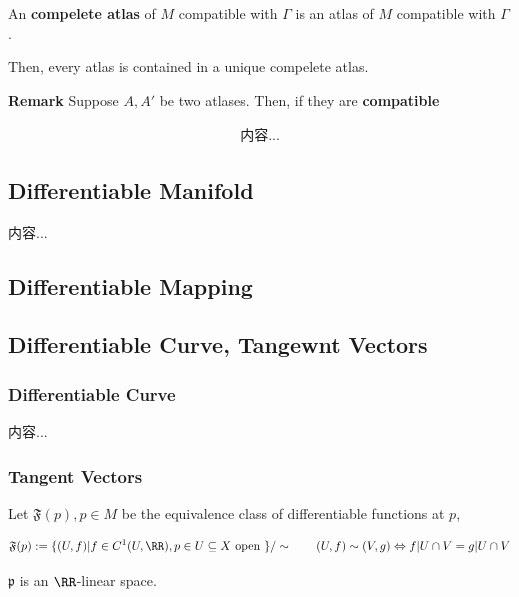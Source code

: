 \documentclass[Total.tex]{subfiles}
\begin{document}
				\begin{Def}
					An \textbf{compelete atlas} of $M$ compatible with $\Gamma$ is an atlas of $M$ compatible with $\Gamma$.
				\end{Def}
				
				Then, every atlas is contained in a unique compelete atlas. 
				
				\textbf{Remark} Suppose $A,A'$ be two atlases. Then, if they are \textbf{compatible}
				
				\begin{gather*}
					内容...
				\end{gather*}
				
				\subsection{Differentiable Manifold}
				
				\begin{Def}
					内容...
				\end{Def}
				
				\subsection{Differentiable Mapping}
				
				\subsection{Differentiable Curve, Tangewnt Vectors}
					
					\subsubsection{Differentiable Curve}
					
						\begin{Def}
							内容...
						\end{Def}
						
					\subsubsection{Tangent Vectors}
						
						\begin{Def}
							Let $\mathfrak{F}(p),p\in M$ be the equivalence class of differentiable functions at $p$,
							
							\begin{gather*}
								\mathfrak{F}(p):=\{(U,f)|f\in C^1(U,\RR),p\in U\subseteq X\mbox{ open }\}/\sim\qquad (U,f)\sim (V,g)\Leftrightarrow f|U\cap V=g|U\cap V
							\end{gather*}
							
							$\mathfrak{p}$ is an $\RR$-linear space.
						\end{Def}
						
\end{document}
